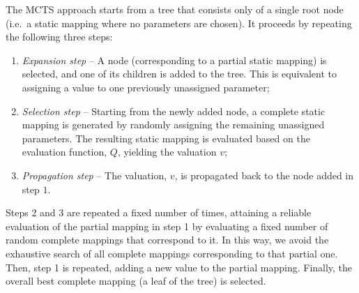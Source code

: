 \documentclass[smallextended]{svjour3}
\begin{document}
The MCTS approach starts from a tree that consists only of a
single 
root node (i.e.\ a static mapping where no
parameters are chosen). It proceeds by repeating the following three steps: 
\begin{enumerate}
\item \emph{Expansion step} -- A node (corresponding to
  a partial static mapping) is selected, and one of its children is
  added to the tree. This is equivalent to assigning a value to one previously unassigned
  parameter;
\item \emph{Selection step} -- Starting from the newly added node, a
  complete static mapping is generated by randomly assigning the
  remaining unassigned parameters. The resulting static mapping is evaluated based on the 
  evaluation function, $Q$, yielding the valuation $v$;
\item \emph{Propagation step} -- The valuation, $v$, is propagated back
  to the node added in step $1$. 
\end{enumerate}

\noindent
Steps 2 and 3 are repeated a fixed number of times, attaining a reliable evaluation of the partial mapping in step 1 by evaluating a fixed number of random complete mappings that correspond to it. In this way, we  avoid the exhaustive search of all complete mappings corresponding to that partial one. Then, step 1 is repeated, adding a new value to the partial mapping.
Finally, the overall best complete mapping (a leaf of the tree) is
selected. 



\end{document}
